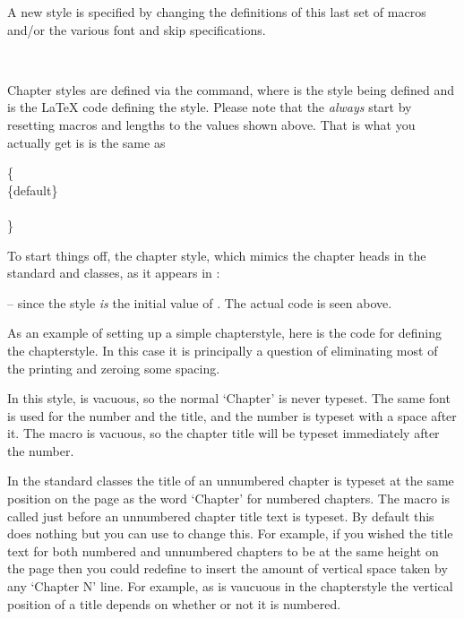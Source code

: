     A new style is specified by changing the definitions of this last set of
macros and/or the various font and skip specifications.

\begin{syntax}
\cmd{\makechapterstyle} \\
\end{syntax}
Chapter styles are defined via the \cmd{\makechapterstyle} command, where
 is the style being defined and  is the LaTeX code
defining the style. Please note that the  \emph{always}
start by resetting macros and lengths to the values shown above. That
is what you actually get is is the same as
\begin{syntax}
\cmd{\makechapterstyle}\{\\
  \cmd{\chapterstyle}\{default\}\\
  \\
\}
\end{syntax}



    To start things off,  the  chapter
style, which mimics the chapter heads in the standard  and
 classes, as it appears in :
\begin{lcode}
\end{lcode}
-- since the  style \emph{is} the initial value of
\cmd{\makechapterstyle}. The actual code is seen above.



    As an example of setting up a simple chapterstyle, here is the code for
defining the  chapterstyle. In this case it is principally
a question of eliminating most of the printing and zeroing some spacing.
\begin{lcode}
\end{lcode}
In this style, \cmd{\printchaptername} is vacuous, so the normal `Chapter'
is never typeset. The same font is used for the number and the title, and
the number is typeset with a space after it. The macro \cmd{\afterchapternum}
is vacuous, so the chapter title will be typeset immediately after the number.

    In the standard classes the title of an unnumbered chapter is typeset
at the same position on the page as the word `Chapter' for numbered chapters.
The macro \cmd{\printchapternonum} is called just before an unnumbered
chapter title text is typeset. By default this does nothing but you can use
\cmd{\renewcommand} to change this. For example, if you wished the title
text for both numbered and unnumbered chapters to be at the same height on
the page then you could redefine \cmd{\printchapternonum} to insert
the amount of vertical space taken by any `Chapter N' line. For example,
as \cmd{\printchapternonum} is vaucuous in the  chapterstyle
the vertical position of a title depends on whether or not it is numbered.

